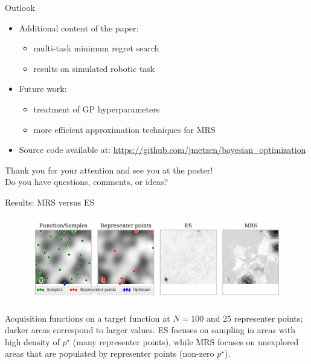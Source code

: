 \documentclass[11pt]{beamer}
\begin{document}
\begin{frame}{Outlook}
  
  \begin{itemize}
    \item Additional content of the paper:
    \begin{itemize}
      \item multi-task minimum regret search
      \item results on simulated robotic task
    \end{itemize}
    \pause
    \item Future work:
    \begin{itemize}
      \item treatment of GP hyperparameters
      \item more efficient approximation techniques for MRS
    \end{itemize}
    \pause
    \item Source code available at: \url{https://github.com/jmetzen/bayesian_optimization}
  \end{itemize}

  \vspace*{1.5cm}
  \pause
  \begin{center}
   Thank you for your attention and see you at the poster! \\
   Do you have questions, comments, or ideas?
   \end{center}

\end{frame}

\begin{frame}{Results: MRS versus ES}
\begin{figure}
\centering
\includegraphics[width=.8\textwidth]{../pics/es_analysis}
\label{fig:es_analysis}
\end{figure}

Acquisition functions on a target function at $N=100$ and 25 representer points; darker areas correspond to larger values. ES focuses on sampling in areas with high density of $p^\star$ (many representer points), while MRS focuses on unexplored areas that are populated by representer points (non-zero $p^\star$).

\end{frame}
\end{document}
